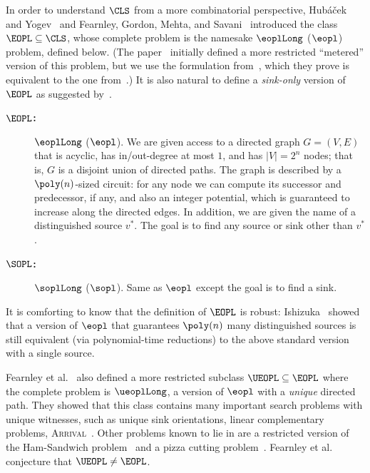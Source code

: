 In order to understand $\CLS$ from a more combinatorial perspective, Hub{\'a}{\v{c}}ek and Yogev~\cite{Hubacek2020} and Fearnley, Gordon, Mehta, and Savani~\cite{Fearnley2020} introduced the class~$\EOPL\subseteq\CLS$, whose complete problem is the namesake $\eoplLong$ ($\eopl$) problem, defined below. (The paper~\cite{Hubacek2020} initially defined a more restricted ``metered'' version of this problem, but we use the formulation from~\cite{Fearnley2020}, which they prove is equivalent to the one from~\cite{Hubacek2020}.) It is also natural to define a \emph{sink-only} version of $\EOPL$ as suggested by~\cite{Goos2018}.
\begin{description}
\item[\bf $\EOPL$:] $\eoplLong$ ($\eopl$). We are given access to a directed graph $G=(V,E)$ that is acyclic, has in/out-degree at most $1$, and has $|V|=2^n$ nodes; that is, $G$ is a disjoint union of directed paths. The graph is described by a $\poly(n)$-sized circuit: for any node we can compute its successor and predecessor, if any, and also an integer potential, which is guaranteed to increase along the directed edges. In addition, we are given the name of a distinguished source $v^*$. The goal is to find any source or sink other than $v^*$.

\item[\bf $\SOPL$:] $\soplLong$ ($\sopl$). Same as $\eopl$ except the goal is to find a sink.
\end{description}
It is comforting to know that the definition of $\EOPL$ is robust: Ishizuka~\cite{Ishizuka2021} showed that a version of $\eopl$ that guarantees $\poly(n)$ many distinguished sources is still equivalent (via polynomial-time reductions) to the above standard version with a single source.

Fearnley et al.~\cite{Fearnley2020} also defined a more restricted subclass $\UEOPL\subseteq\EOPL$ where the complete problem is $\ueoplLong$, a version of $\eopl$ with a \emph{unique} directed path. They showed that this class contains many important search problems with unique witnesses, such as unique sink orientations, linear complementary problems, {\scshape Arrival}~\cite{Dohrau2017,Gaertner2018}. Other problems known to lie in \UEOPL are a restricted version of the Ham-Sandwich problem~\cite{Chiu2020} and a pizza cutting problem~\cite{Schnider2021}. Fearnley et al.~\cite{Fearnley2020} conjecture that $\UEOPL\neq\EOPL$.



